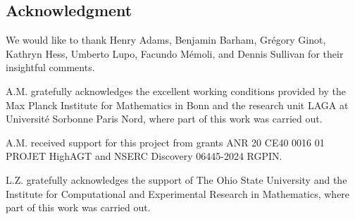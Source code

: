 
\subsection*{Acknowledgment}

We would like to thank Henry Adams, Benjamin Barham, Gr\'egory Ginot, Kathryn Hess, Umberto Lupo, Facundo M\'emoli, and Dennis Sullivan for their insightful comments.

A.M. gratefully acknowledges the excellent working conditions provided by the Max Planck Institute for Mathematics in Bonn and the research unit LAGA at Université Sorbonne Paris Nord, where part of this work was carried out.

A.M. received support for this project from grants ANR 20 CE40 0016 01 PROJET HighAGT and NSERC Discovery 06445-2024 RGPIN.

L.Z. gratefully acknowledges the support of The Ohio State University and the Institute for Computational and Experimental Research in Mathematics, where part of this work was carried out.

